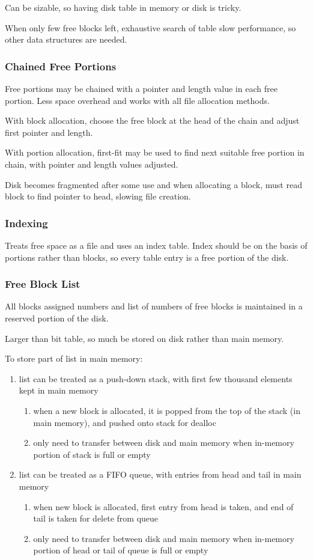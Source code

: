 \documentclass[11pt]{article}
\begin{document}
Can be sizable, so having disk table in memory or disk is tricky.

When only few free blocks left, exhaustive search of table slow performance, so other
data structures are needed.
\subsubsection{Chained Free Portions}
\label{sec:org47a4871}
Free portions may be chained with a pointer and length value in each free portion. Less space
overhead and works with all file allocation methods.

With block allocation, choose the free block at the head of the chain and adjust first pointer and
length.

With portion allocation, first-fit may be used to find next suitable free portion in chain, with
pointer and length values adjusted.

Disk becomes fragmented after some use and when allocating a block, must read block to find
pointer to head, slowing file creation.
\subsubsection{Indexing}
\label{sec:org154990d}
Treats free space as a file and uses an index table.
Index should be on the basis of portions rather than blocks, so every table entry is a free portion
of the disk.
\subsubsection{Free Block List}
\label{sec:org1b6a3c7}
All blocks assigned numbers and list of numbers of free blocks is maintained in a reserved portion
of the disk.

Larger than bit table, so much be stored on disk rather than main memory.

To store part of list in main memory:
\begin{enumerate}
\item list can be treated as a push-down stack, with first few thousand elements kept in main memory
\begin{enumerate}
\item when a new block is allocated, it is popped from the top of the stack (in main memory), and
pushed onto stack for dealloc
\item only need to transfer between disk and main memory when in-memory portion of stack is full
or empty
\end{enumerate}
\item list can be treated as a FIFO queue, with entries from head and tail in main memory
\begin{enumerate}
\item when new block is allocated, first entry from head is taken, and end of tail is taken for
delete from queue
\item only need to transfer between disk and main memory when in-memory portion of head or tail of
queue is full or empty
\end{enumerate}
\end{enumerate}
\end{document}
